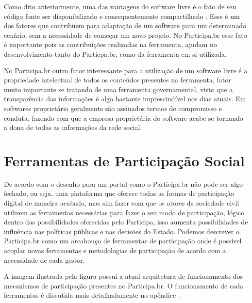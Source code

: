 Como dito anteriormente, uma das vantagens do software livre é o fato de seu código fonte ser disponibilizado e consequentemente compartilhado \cite{bucher2013rede}. Esse é um dos fatores que contribuem para adaptação de um software para um determinado cenário, sem a necessidade de começar um novo projeto. No Participa.br esse fato é importante pois as contribuições realizadas na ferramenta, ajudam no desenvolvimento tanto do Particpa.br, como da ferramenta em si utilizada.

No Participa.br outro fator interessante para a utilização de um software livre é a propriedade intelectual de todos os conteúdos presentes na ferramenta, fator muito importante se tratando de uma ferramenta governamental, visto que a transparência das informações é algo bastante imprescindível nos dias atuais. Em softwares proprietário geralmente são assinados termos de compromisso e conduta, fazendo com que a empresa proprietária do software acabe se tornando a dona de todas as informações da rede social.

\section{Ferramentas de Participação Social}

De acordo com \cite{solagna2014metodologias} o desenho para um portal como o Participa.br não pode ser algo fechado, ou seja, uma plataforma que oferece todas as formas de participação digital de maneira acabada, mas sim fazer com que os atores da sociedade civil utilizem as ferramentas necessárias para fazer o seu modo de participação, lógico dentro das possibilidades oferecidas pelo Participa, isso aumenta possibilidades de influência nas políticas públicas e nas decisões do Estado. Podemos descrever o Participa.br como um arcabouço de ferramentas de participação onde é possível acoplar novas ferramentas e metodologias de participação de acordo com a necessidade de cada gestor.

A imagem ilustrada pela figura \label{fig:arquiteturaparticipa} possui a atual arquitetura de funcionamento dos mecanismos de participação presentes no Participa.br. O funcionamento de cada ferramentas é discutida mais detalhadamente no   apêndice \label{Att:ferramentasparticipacao}.

